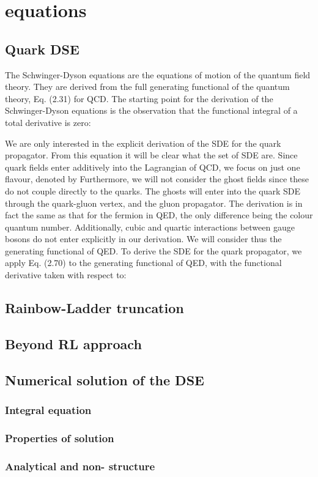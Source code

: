 \chapter{\DS equations}
\label{chap:dse}

\section{Quark DSE}
The Schwinger-Dyson equations are the equations of motion of the quantum field theory.
They are derived from the full generating functional of the quantum theory, Eq. (2.31)
for QCD. The starting point for the derivation of the Schwinger-Dyson equations is the
observation that the functional integral of a total derivative is zero:

We are only interested in the explicit derivation of the SDE for the quark propagator.
From this equation it will be clear what the set of SDE are. Since quark fields enter
additively into the Lagrangian of QCD, we focus on just one flavour, denoted by
Furthermore, we will not consider the ghost fields since these do not couple directly to
the quarks. The ghosts will enter into the quark SDE through the quark-gluon vertex,
and the gluon propagator. The derivation is in fact the same as that for the fermion
in QED, the only difference being the colour quantum number. Additionally, cubic and
quartic interactions between gauge bosons do not enter explicitly in our derivation. We
will consider thus the generating functional of QED.
To derive the SDE for the quark propagator, we apply Eq. (2.70) to the generating
functional of QED, with the functional derivative taken with respect to:

\section{Rainbow-Ladder truncation}
\section{Beyond RL approach}
\section{Numerical solution of the DSE}
	\subsection*{Integral equation}
	\subsection*{Properties of solution}
	\subsection*{Analytical and non- structure}